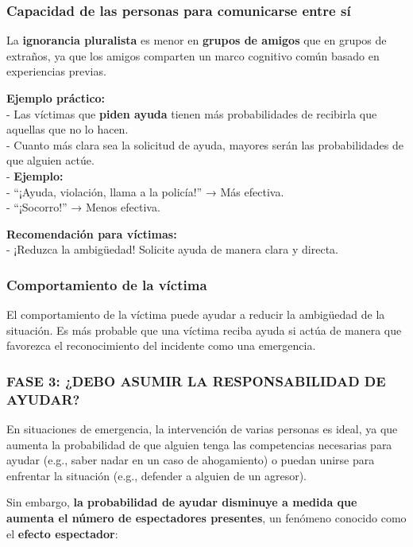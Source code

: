 \documentclass[
]{book}
\begin{document}
\subsubsection{Capacidad de las personas para comunicarse entre sí}\label{capacidad-de-las-personas-para-comunicarse-entre-suxed}

La \textbf{ignorancia pluralista} es menor en \textbf{grupos de amigos} que en grupos de extraños, ya que los amigos comparten un marco cognitivo común basado en experiencias previas.

\textbf{Ejemplo práctico:}\\
- Las víctimas que \textbf{piden ayuda} tienen más probabilidades de recibirla que aquellas que no lo hacen.\\
- Cuanto más clara sea la solicitud de ayuda, mayores serán las probabilidades de que alguien actúe.\\
- \textbf{Ejemplo:}\\
- ``¡Ayuda, violación, llama a la policía!'' → Más efectiva.\\
- ``¡Socorro!'' → Menos efectiva.

\textbf{Recomendación para víctimas:}\\
- ¡Reduzca la ambigüedad! Solicite ayuda de manera clara y directa.

\subsubsection{Comportamiento de la víctima}\label{comportamiento-de-la-vuxedctima}

El comportamiento de la víctima puede ayudar a reducir la ambigüedad de la situación. Es más probable que una víctima reciba ayuda si actúa de manera que favorezca el reconocimiento del incidente como una emergencia.

\subsubsection{FASE 3: ¿DEBO ASUMIR LA RESPONSABILIDAD DE AYUDAR?}\label{fase-3-debo-asumir-la-responsabilidad-de-ayudar}

En situaciones de emergencia, la intervención de varias personas es ideal, ya que aumenta la probabilidad de que alguien tenga las competencias necesarias para ayudar (e.g., saber nadar en un caso de ahogamiento) o puedan unirse para enfrentar la situación (e.g., defender a alguien de un agresor).

Sin embargo, \textbf{la probabilidad de ayudar disminuye a medida que aumenta el número de espectadores presentes}, un fenómeno conocido como el \textbf{efecto espectador}:
\end{document}
